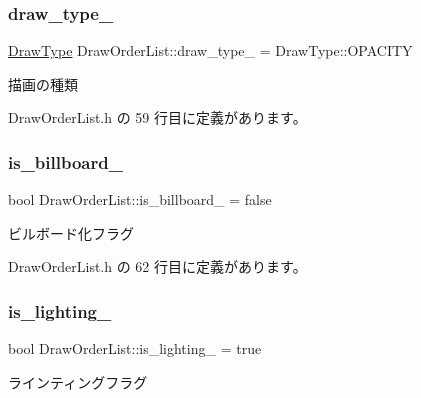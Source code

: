 \subsubsection{\texorpdfstring{draw\+\_\+type\+\_\+}{draw\_type\_}}
{\footnotesize\ttfamily \mbox{\hyperlink{class_draw_order_list_a6c9b9ceb312c16d399ef355f4f3486bb}{Draw\+Type}} Draw\+Order\+List\+::draw\+\_\+type\+\_\+ = Draw\+Type\+::\+O\+P\+A\+C\+I\+TY\hspace{0.3cm}{\ttfamily [private]}}



描画の種類 



 Draw\+Order\+List.\+h の 59 行目に定義があります。

\mbox{\label{class_draw_order_list_ae9a77121ff108d8f0ee0c73065f99a75}} 
\subsubsection{\texorpdfstring{is\+\_\+billboard\+\_\+}{is\_billboard\_}}
{\footnotesize\ttfamily bool Draw\+Order\+List\+::is\+\_\+billboard\+\_\+ = false\hspace{0.3cm}{\ttfamily [private]}}



ビルボード化フラグ 



 Draw\+Order\+List.\+h の 62 行目に定義があります。

\mbox{\label{class_draw_order_list_a26e72a0f47cc2c791eeb87fe6aadeee9}} 
\subsubsection{\texorpdfstring{is\+\_\+lighting\+\_\+}{is\_lighting\_}}
{\footnotesize\ttfamily bool Draw\+Order\+List\+::is\+\_\+lighting\+\_\+ = true\hspace{0.3cm}{\ttfamily [private]}}



ラインティングフラグ 



